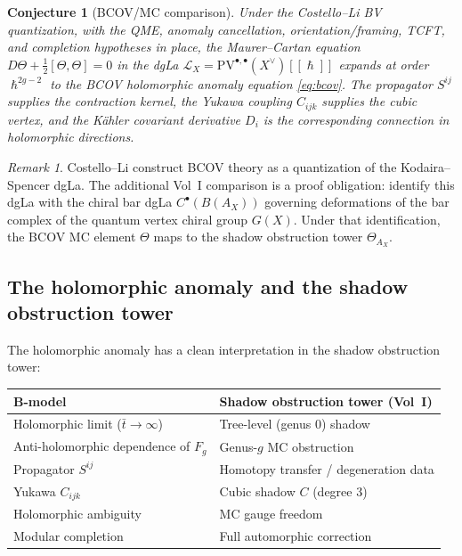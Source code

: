 \documentclass[11pt]{amsart}
\theoremstyle{plain}
\newtheorem{conjecture}[theorem]{Conjecture}
\theoremstyle{definition}
\theoremstyle{remark}
\newtheorem{remark}[theorem]{Remark}
\renewcommand{\hbar}{\hslash}
\begin{document}
\begin{conjecture}[BCOV/MC comparison]
\label{prop:mc-bcov}
Under the Costello--Li BV quantization, with the QME, anomaly
cancellation, orientation/framing, TCFT, and completion hypotheses in
place, the Maurer--Cartan equation
$D\Theta + \frac{1}{2}[\Theta,\Theta] = 0$ in the dgLa
$\mathcal{L}_X = \mathrm{PV}^{\bullet,\bullet}(X^\vee)[[\hbar]]$ expands
at order $\hbar^{2g-2}$ to the BCOV holomorphic anomaly equation
\eqref{eq:bcov}. The propagator $S^{ij}$ supplies the contraction kernel,
the Yukawa coupling $C_{ijk}$ supplies the cubic vertex, and the
K\"ahler covariant derivative $D_i$ is the corresponding connection in
holomorphic directions.
\end{conjecture}

\begin{remark}
Costello--Li construct BCOV theory as a quantization of the
Kodaira--Spencer dgLa. The additional Vol~I comparison is a proof
obligation: identify this dgLa with the chiral bar dgLa
$C^\bullet(B(A_X))$ governing deformations of the bar complex of the
quantum vertex chiral group $G(X)$. Under that identification, the BCOV
MC element $\Theta$ maps to the shadow obstruction tower $\Theta_{A_X}$.
\end{remark}

\subsection{The holomorphic anomaly and the shadow obstruction tower}
\label{sub:anomaly-shadow}

The holomorphic anomaly has a clean interpretation in the shadow obstruction tower:

\begin{center}
\renewcommand{\arraystretch}{1.5}
\begin{tabular}{ll}
 \hline
 \textbf{B-model} & \textbf{Shadow obstruction tower (Vol~I)} \\
 \hline
 Holomorphic limit ($\bar{t} \to \infty$) & Tree-level (genus 0) shadow \\
 Anti-holomorphic dependence of $F_g$ & Genus-$g$ MC obstruction \\
 Propagator $S^{ij}$ & Homotopy transfer / degeneration data \\
 Yukawa $C_{ijk}$ & Cubic shadow $C$ (degree 3) \\
 Holomorphic ambiguity & MC gauge freedom \\
 Modular completion & Full automorphic correction \\
 \hline
\end{tabular}
\end{center}
\end{document}
